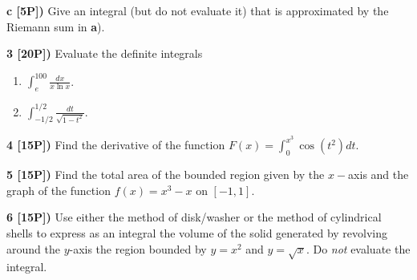 \documentclass[12pt]{article}
\begin{document}
{\bf c [5P])} Give an integral 
(but do not evaluate it) that is approximated by the Riemann sum in {\bf a}).

\vspace{.5in}


\newpage

{\bf 3 [20P])} Evaluate the definite integrals
\begin{enumerate}
\item \;${\displaystyle \int_e^{100} \frac{dx}{ x\ln x} }$.
\item \;${\displaystyle \int^{1/2}_{-1/2} \frac{dt}{\sqrt{1-t^2}} }$.
\end{enumerate}

\vspace{4.25in}

{\bf 4 [15P])} Find the derivative of the function
${\displaystyle F(x) = \int_0^{x^3}  \cos (t^2) dt }$.

\vspace{2.67in}

\newpage

{\bf 5 [15P])} Find the total area of the bounded region given by the
${\displaystyle x-}$axis and the graph of the function
${\displaystyle f(x) = x^3-x }$ on $[-1,1]$.

\vspace{3.90in}
 


{\bf 6 [15P])} Use either the method of disk/washer or the method of 
cylindrical shells to express as an integral
the volume of the solid generated by revolving around the
$y$-axis the region bounded by $y= x^2$ and
$y=\sqrt{x}$.  Do {\em not} evaluate the integral.
\end{document}
